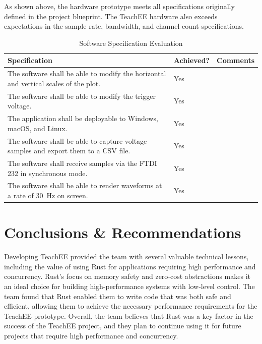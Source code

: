 \documentclass[letterpaper,11pt]{article}
\begin{document}
As shown above, the hardware prototype meets all specifications originally
defined in the project blueprint. The TeachEE hardware also exceeds expectations
in the sample rate, bandwidth, and channel count specifications.

\begin{table}[H]
  \caption{Software Specification Evaluation}
  \begin{tabularx}{\textwidth}{l|l|p{5cm}}
    Specification & Achieved? & Comments\\
    \hline
    The software shall be able to modify the horizontal and vertical scales of the plot. & Yes & \\
    The software shall be able to modify the trigger voltage. & Yes & \\
    The application shall be deployable to Windows, macOS, and Linux. & Yes & \\
    \hline
    The software shall be able to capture voltage samples and export them to a CSV file. & Yes & \\
    The software shall receive samples via the FTDI 232 in synchronous mode. & Yes & \\
    \hline
    The software shall be able to render waveforms at a rate of \SI{30}{\hertz} on screen. & Yes & \\
    \hline
  \end{tabularx} 
  \label{tab:sw-spec-eval}
\end{table}

\section{Conclusions \& Recommendations} %

Developing TeachEE provided the team with several valuable technical lessons,
including the value of using Rust for applications requiring high performance
and concurrency. Rust's focus on memory safety and zero-cost abstractions makes
it an ideal choice for building high-performance systems with low-level
control. The team found that Rust enabled them to write code that was both safe
and efficient, allowing them to achieve the necessary performance requirements
for the TeachEE prototype. Overall, the team believes that Rust was a key
factor in the success of the TeachEE project, and they plan to continue using
it for future projects that require high performance and concurrency.
\end{document}
